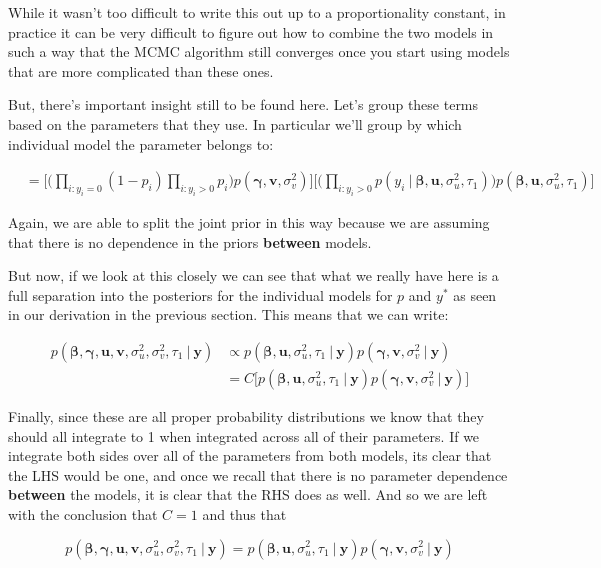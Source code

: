 \documentclass[12pt,twoside]{reedthesis}
\begin{document}
While it wasn't too difficult to write this out up to a proportionality constant, in practice it can be very difficult to figure out how to combine the two models in such a way that the MCMC algorithm still converges once you start using models that are more complicated than these ones.

But, there's important insight still to be found here. Let's group these terms based on the parameters that they use. In particular we'll group by which individual model the parameter belongs to:

\[
\begin{aligned}
&= \Bigg[\Big(\prod_{i:y_i = 0}(1- p_i)\prod_{i: y_i > 0}p_i\Big)p(\boldsymbol{\gamma}, \mathbf{v}, \sigma_v^2)\Bigg]\Bigg[\Big(\prod_{i:y_i > 0}p(y_i \ | \ \boldsymbol{\beta}, \mathbf{u}, \sigma_u^2, \tau_1)\Big)p(\boldsymbol{\beta},\mathbf{u}, \sigma_u^2, \tau_1)\Bigg]
\end{aligned}
\]

Again, we are able to split the joint prior in this way because we are assuming that there is no dependence in the priors \textbf{between} models.

But now, if we look at this closely we can see that what we really have here is a full separation into the posteriors for the individual models for \(p\) and \(y^*\) as seen in our derivation in the previous section. This means that we can write:

\[
\begin{aligned}
p(\boldsymbol{\beta}, \boldsymbol{\gamma}, \mathbf{u}, \mathbf{v}, \sigma_u^2, \sigma_v^2, \tau_1\ | \ \mathbf{y})  &\propto p(\boldsymbol{\beta}, \mathbf{u}, \sigma_u^2, \tau_1 \ | \ \mathbf{y})p(\boldsymbol{\gamma}, \mathbf{v}, \sigma_v^2 \ | \ \mathbf{y}) \\
  &= C\bigg[p(\boldsymbol{\beta}, \mathbf{u}, \sigma_u^2, \tau_1 \ | \ \mathbf{y})p(\boldsymbol{\gamma}, \mathbf{v}, \sigma_v^2 \ | \ \mathbf{y})\bigg]
\end{aligned}
\]

Finally, since these are all proper probability distributions we know that they should all integrate to 1 when integrated across all of their parameters. If we integrate both sides over all of the parameters from both models, its clear that the LHS would be one, and once we recall that there is no parameter dependence \textbf{between} the models, it is clear that the RHS does as well. And so we are left with the conclusion that \(C = 1\) and thus that

\[
p(\boldsymbol{\beta}, \boldsymbol{\gamma}, \mathbf{u}, \mathbf{v}, \sigma_u^2, \sigma_v^2, \tau_1\ | \ \mathbf{y})  = p(\boldsymbol{\beta}, \mathbf{u}, \sigma_u^2, \tau_1 \ | \ \mathbf{y})p(\boldsymbol{\gamma}, \mathbf{v}, \sigma_v^2 \ | \ \mathbf{y}) 
\]
\end{document}
